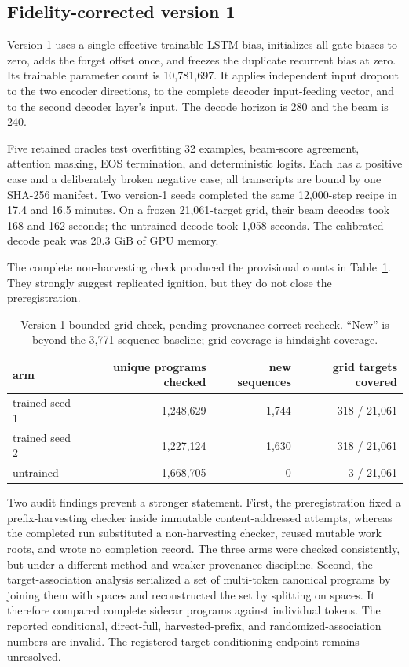 \documentclass[11pt]{article}
\begin{document}
\subsection{Fidelity-corrected version 1}
\label{sec:nmt-v1}

Version 1 uses a single effective trainable LSTM bias, initializes all gate biases to zero,
adds the forget offset once, and freezes the duplicate recurrent bias at zero.  Its
trainable parameter count is 10,781,697.  It applies independent input dropout to the two
encoder directions, to the complete decoder input-feeding vector, and to the second
decoder layer's input.  The decode horizon is 280 and the beam is 240.

Five retained oracles test overfitting 32 examples, beam-score agreement, attention masking,
EOS termination, and deterministic logits.  Each has a positive case and a deliberately
broken negative case; all transcripts are bound by one SHA-256 manifest.  Two version-1
seeds completed the same 12,000-step recipe in 17.4 and 16.5 minutes.  On a frozen
21,061-target grid, their beam decodes took 168 and 162 seconds; the untrained decode took
1,058 seconds.  The calibrated decode peak was 20.3 GiB of GPU memory.

The complete non-harvesting check produced the provisional counts in
Table~\ref{tab:nmtv1}.  They strongly suggest replicated ignition, but they do not close
the preregistration.

\begin{table}[ht]
\centering
\caption{Version-1 bounded-grid check, pending provenance-correct recheck.  ``New'' is
beyond the 3,771-sequence baseline; grid coverage is hindsight coverage.}
\label{tab:nmtv1}
\begin{tabular}{@{}lrrr@{}}
\toprule
arm & unique programs checked & new sequences & grid targets covered \\
\midrule
trained seed 1 & 1,248,629 & 1,744 & 318 / 21,061 \\
trained seed 2 & 1,227,124 & 1,630 & 318 / 21,061 \\
untrained      & 1,668,705 & 0     & 3 / 21,061 \\
\bottomrule
\end{tabular}
\end{table}

Two audit findings prevent a stronger statement.  First, the preregistration fixed a
prefix-harvesting checker inside immutable content-addressed attempts, whereas the completed
run substituted a non-harvesting checker, reused mutable work roots, and wrote no completion
record.  The three arms were checked consistently, but under a different method and weaker
provenance discipline.  Second, the target-association analysis serialized a set of
multi-token canonical programs by joining them with spaces and reconstructed the set by
splitting on spaces.  It therefore compared complete sidecar programs against individual
tokens.  The reported conditional, direct-full, harvested-prefix, and
randomized-association numbers are invalid.  The registered target-conditioning endpoint
remains unresolved.
\end{document}

